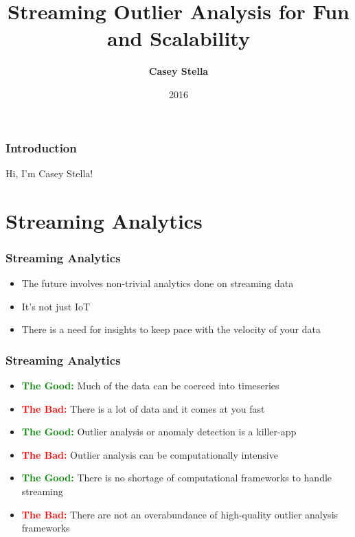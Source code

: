 \documentclass{beamer}
\begin{document}
\author{{\bf Casey Stella}}
\title{{\bf Streaming Outlier Analysis for Fun and Scalability}}
\date{2016} 

\frame{\titlepage} 

\begingroup
\Huge
\begin{frame}
\frametitle{Introduction}
\begin{center}
Hi, I'm Casey Stella!
\end{center}
\end{frame}
\endgroup

\section{Streaming Analytics}
\begin{frame}
\frametitle{Streaming Analytics}
\begin{itemize}
\item The future involves non-trivial analytics done on streaming data
\item It's not just IoT
\item There is a need for insights to keep pace with the velocity of your data
\end{itemize}
\end{frame}

\begin{frame}
\frametitle{Streaming Analytics}
\begin{itemize}
\item {\textcolor{green}{\bf The Good:}} Much of the data can be coerced into timeseries\pause
\item {\textcolor{red}{\bf The Bad:}} There is a lot of data and it comes at you fast\pause
\item {\textcolor{green}{\bf The Good:}} Outlier analysis or anomaly detection is a killer-app\pause
\item {\textcolor{red}{\bf The Bad:}} Outlier analysis can be computationally intensive\pause
\item {\textcolor{green}{\bf The Good:}} There is no shortage of computational frameworks to handle streaming\pause
\item {\textcolor{red}{\bf The Bad:}} There are not an overabundance of high-quality outlier analysis frameworks
\end{itemize}
\end{frame}
\end{document}
